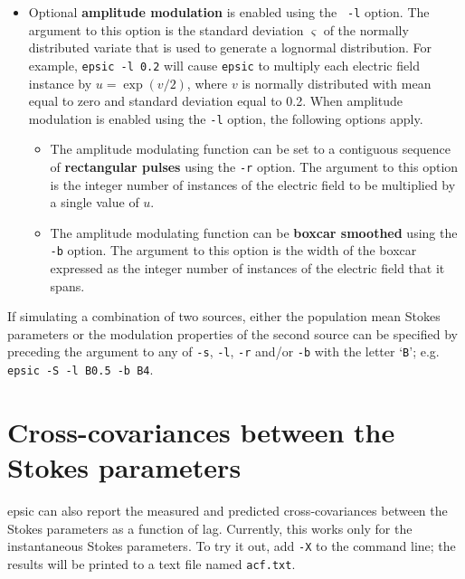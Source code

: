 \documentclass[12pt]{article}
\begin{document}
\begin{itemize}
\item Optional {\bf amplitude modulation} is enabled using the {\tt
  -l} option.  The argument to this option is the standard deviation
  $\varsigma$ of the normally distributed variate that is used to
  generate a lognormal distribution.  For example, {\tt epsic -l
    0.2} will cause {\tt epsic} to multiply each electric field
  instance by $u=\exp(v/2)$, where $v$ is normally distributed with
  mean equal to zero and standard deviation equal to 0.2.  When
  amplitude modulation is enabled using the {\tt -l} option, the
  following options apply.
  
  \begin{itemize}
  \item
    The amplitude modulating function can be set to a contiguous
    sequence of {\bf rectangular pulses} using the {\tt -r} option.  The
    argument to this option is the integer number of instances of the
    electric field to be multiplied by a single value of $u$. 
  \item
    The amplitude modulating function can be {\bf boxcar smoothed} using the
    {\tt -b} option.  The argument to this option is the width of the
    boxcar expressed as the integer number of instances of the
    electric field that it spans.
  \end{itemize}

\end{itemize}
%

\noindent
If simulating a combination of two sources, either the population mean
Stokes parameters or the modulation properties of
  the second source can be specified by preceding the argument to any
  of {\tt -s}, {\tt -l}, {\tt -r} and/or {\tt -b} with the letter `{\tt B}';
  e.g. {\tt epsic -S -l B0.5 -b B4}.

\section{ Cross-covariances between the Stokes parameters }

{\sc epsic} can also report the measured and predicted cross-covariances between the Stokes parameters as a function of lag.  Currently, this works only for the instantaneous Stokes parameters.  To try it out, add {\tt -X} to the command line; the results will be printed to a text file named {\tt acf.txt}.
\end{document}
